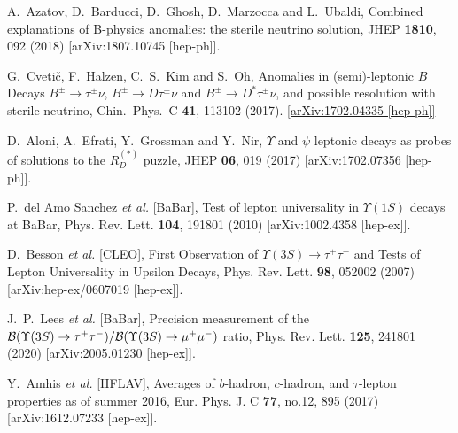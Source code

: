 \documentclass[reprint,showpacs,aps,prd,nofootinbib,superscriptaddress,longbibliography]{revtex4-1}
\begin{document}
\begin{thebibliography}{99}

A.~Azatov, D.~Barducci, D.~Ghosh, D.~Marzocca and L.~Ubaldi, Combined explanations of B-physics anomalies: the sterile neutrino solution, JHEP {\bf 1810}, 092 (2018)  [arXiv:1807.10745 [hep-ph]].

G.~Cveti\v{c}, F.~Halzen, C.~S.~Kim and S.~Oh,  Anomalies in (semi)-leptonic $B$ Decays $B^{\pm} \to \tau^{\pm} \nu$, $B^{\pm} \to D \tau^{\pm} \nu$ and $B^{\pm} \to D^* \tau^{\pm} \nu$, and possible resolution with sterile neutrino, Chin.\ Phys.\ C {\bf 41}, 113102 (2017). \href{http://arxiv.org/abs/1702.04335}{[arXiv:1702.04335 [hep-ph]]}


D.~Aloni, A.~Efrati, Y.~Grossman and Y.~Nir, $\Upsilon$ and $\psi$ leptonic decays as probes of solutions to the $R_D^{(*)}$ puzzle, JHEP \textbf{06}, 019 (2017)
[arXiv:1702.07356 [hep-ph]].

P.~del Amo Sanchez \textit{et al.} [BaBar], Test of lepton universality in $\Upsilon(1S)$ decays at BaBar,
Phys. Rev. Lett. \textbf{104}, 191801 (2010)
[arXiv:1002.4358 [hep-ex]].

D.~Besson \textit{et al.} [CLEO], First Observation of $\Upsilon(3S) \to \tau^+ \tau^-$ and Tests of Lepton Universality in Upsilon Decays, Phys. Rev. Lett. \textbf{98}, 052002 (2007)
[arXiv:hep-ex/0607019 [hep-ex]].

J.~P.~Lees \textit{et al.} [BaBar], Precision measurement of the ${\cal B}(\Upsilon(3S)\to\tau^+\tau^-)/{\cal B}(\Upsilon(3S)\to\mu^+\mu^-)$ ratio, Phys. Rev. Lett. \textbf{125}, 241801 (2020)
[arXiv:2005.01230 [hep-ex]].

Y.~Amhis \textit{et al.} [HFLAV], Averages of $b$-hadron, $c$-hadron, and $\tau$-lepton properties as of summer 2016, Eur. Phys. J. C \textbf{77}, no.12, 895 (2017)
[arXiv:1612.07233 [hep-ex]].



\end{thebibliography}
\end{document}
